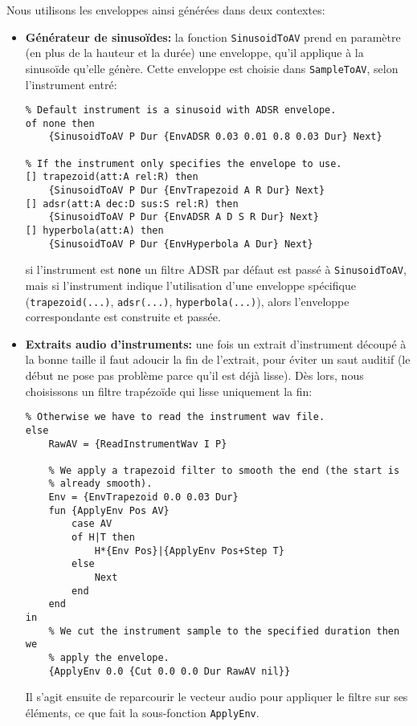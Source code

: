 \documentclass[a4paper,12pt]{article}
\begin{document}
Nous utilisons les enveloppes ainsi générées dans deux contextes:
\begin{itemize}
    \item \textbf{Générateur de sinusoïdes:}
        la fonction \texttt{SinusoidToAV} prend en paramètre (en plus de la
        hauteur et la durée) une enveloppe, qu'il applique à la sinusoïde
        qu'elle génère. Cette enveloppe est choisie dans \texttt{SampleToAV},
        selon l'instrument entré:
\begin{lstlisting}
% Default instrument is a sinusoid with ADSR envelope.
of none then
    {SinusoidToAV P Dur {EnvADSR 0.03 0.01 0.8 0.03 Dur} Next}

% If the instrument only specifies the envelope to use.
[] trapezoid(att:A rel:R) then
    {SinusoidToAV P Dur {EnvTrapezoid A R Dur} Next}
[] adsr(att:A dec:D sus:S rel:R) then
    {SinusoidToAV P Dur {EnvADSR A D S R Dur} Next}
[] hyperbola(att:A) then
    {SinusoidToAV P Dur {EnvHyperbola A Dur} Next}
\end{lstlisting}
        si l'instrument est \texttt{none} un filtre ADSR par défaut est
        passé à \texttt{SinusoidToAV}, mais si l'instrument indique
        l'utilisation d'une enveloppe spécifique
        (\texttt{trapezoid(...)}, \texttt{adsr(...)}, \texttt{hyperbola(...)}),
        alors l'enveloppe correspondante est construite et passée.
    \item \textbf{Extraits audio d'instruments:}
        une fois un extrait d'instrument découpé à la bonne taille il faut
        adoucir la fin de l'extrait, pour éviter un saut auditif (le début ne
        pose pas problème parce qu'il est déjà lisse).
        Dès lors, nous choisissons un filtre trapézoïde qui lisse uniquement la
        fin:
\begin{lstlisting}
% Otherwise we have to read the instrument wav file.
else
    RawAV = {ReadInstrumentWav I P}
    
    % We apply a trapezoid filter to smooth the end (the start is
    % already smooth).
    Env = {EnvTrapezoid 0.0 0.03 Dur}
    fun {ApplyEnv Pos AV}
        case AV
        of H|T then
            H*{Env Pos}|{ApplyEnv Pos+Step T}
        else
            Next
        end
    end
in
    % We cut the instrument sample to the specified duration then we
    % apply the envelope.
    {ApplyEnv 0.0 {Cut 0.0 0.0 Dur RawAV nil}}
\end{lstlisting}
        Il s'agit ensuite de reparcourir le vecteur audio pour appliquer le
        filtre sur ses éléments, ce que fait la sous-fonction \texttt{ApplyEnv}.
\end{itemize}
\end{document}
